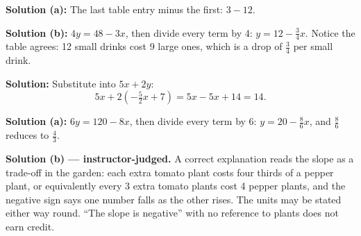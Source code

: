 \documentclass[12pt]{article}
\begin{document}

\textbf{Solution (a):} The last table entry minus the first: $3 - 12$.

\textbf{Solution (b):} $4y = 48 - 3x$, then divide every term by 4:
$y = 12 - \frac{3}{4}x$. Notice the table agrees: 12 small drinks cost
9 large ones, which is a drop of $\frac{3}{4}$ per small drink.


\textbf{Solution:} Substitute into $5x + 2y$:
\[
  5x + 2\left(-\tfrac{5}{2}x + 7\right) = 5x - 5x + 14 = 14 .
\]


\textbf{Solution (a):} $6y = 120 - 8x$, then divide every term by 6:
$y = 20 - \frac{8}{6}x$, and $\frac{8}{6}$ reduces to $\frac{4}{3}$.

\textbf{Solution (b) --- instructor-judged.} A correct explanation reads the
slope as a trade-off in the garden: each extra tomato plant costs four thirds
of a pepper plant, or equivalently every 3 extra tomato plants cost 4 pepper
plants, and the negative sign says one number falls as the other rises. The
units may be stated either way round. ``The slope is negative'' with no
reference to plants does not earn credit.
\end{document}
